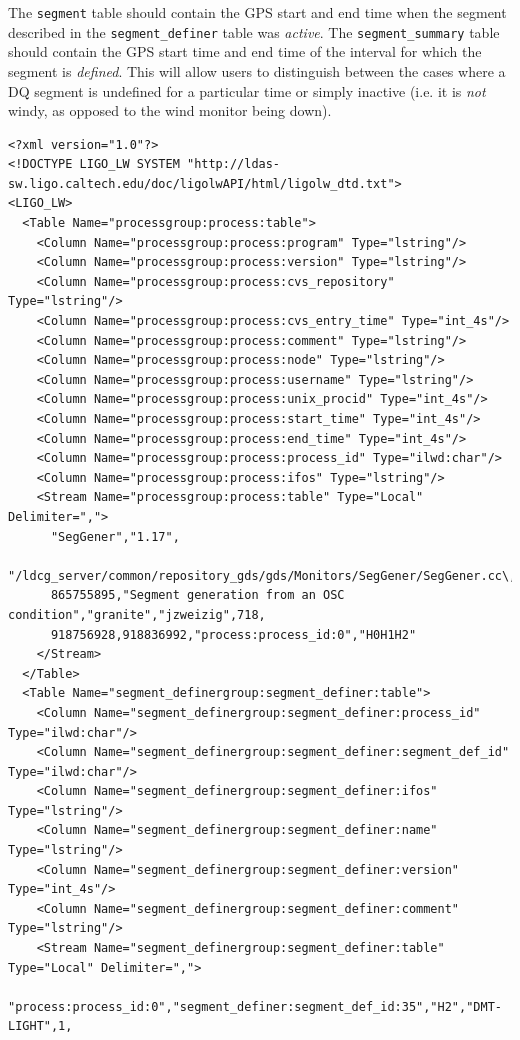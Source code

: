 The \verb|segment| table should contain the GPS start and end time when the
segment described in the \verb|segment_definer| table was \emph{active}. The 
\verb|segment_summary| table should contain the GPS start time and end time of
the interval for which the segment is \emph{defined}. This will allow users to
distinguish between the cases where a DQ segment is undefined for a particular
time or simply inactive (i.e. it is \emph{not} windy, as opposed to the wind
monitor being down).

{\tiny
\begin{verbatim}
<?xml version="1.0"?>
<!DOCTYPE LIGO_LW SYSTEM "http://ldas-sw.ligo.caltech.edu/doc/ligolwAPI/html/ligolw_dtd.txt">
<LIGO_LW>
  <Table Name="processgroup:process:table">
    <Column Name="processgroup:process:program" Type="lstring"/>
    <Column Name="processgroup:process:version" Type="lstring"/>
    <Column Name="processgroup:process:cvs_repository" Type="lstring"/>
    <Column Name="processgroup:process:cvs_entry_time" Type="int_4s"/>
    <Column Name="processgroup:process:comment" Type="lstring"/>
    <Column Name="processgroup:process:node" Type="lstring"/>
    <Column Name="processgroup:process:username" Type="lstring"/>
    <Column Name="processgroup:process:unix_procid" Type="int_4s"/>
    <Column Name="processgroup:process:start_time" Type="int_4s"/>
    <Column Name="processgroup:process:end_time" Type="int_4s"/>
    <Column Name="processgroup:process:process_id" Type="ilwd:char"/>
    <Column Name="processgroup:process:ifos" Type="lstring"/>
    <Stream Name="processgroup:process:table" Type="Local" Delimiter=",">
      "SegGener","1.17",
      "/ldcg_server/common/repository_gds/gds/Monitors/SegGener/SegGener.cc\,v",
      865755895,"Segment generation from an OSC condition","granite","jzweizig",718,
      918756928,918836992,"process:process_id:0","H0H1H2"
    </Stream>
  </Table>
  <Table Name="segment_definergroup:segment_definer:table">
    <Column Name="segment_definergroup:segment_definer:process_id" Type="ilwd:char"/>
    <Column Name="segment_definergroup:segment_definer:segment_def_id" Type="ilwd:char"/>
    <Column Name="segment_definergroup:segment_definer:ifos" Type="lstring"/>
    <Column Name="segment_definergroup:segment_definer:name" Type="lstring"/>
    <Column Name="segment_definergroup:segment_definer:version" Type="int_4s"/>
    <Column Name="segment_definergroup:segment_definer:comment" Type="lstring"/>
    <Stream Name="segment_definergroup:segment_definer:table" Type="Local" Delimiter=",">
      "process:process_id:0","segment_definer:segment_def_id:35","H2","DMT-LIGHT",1,

\end{verbatim}}
